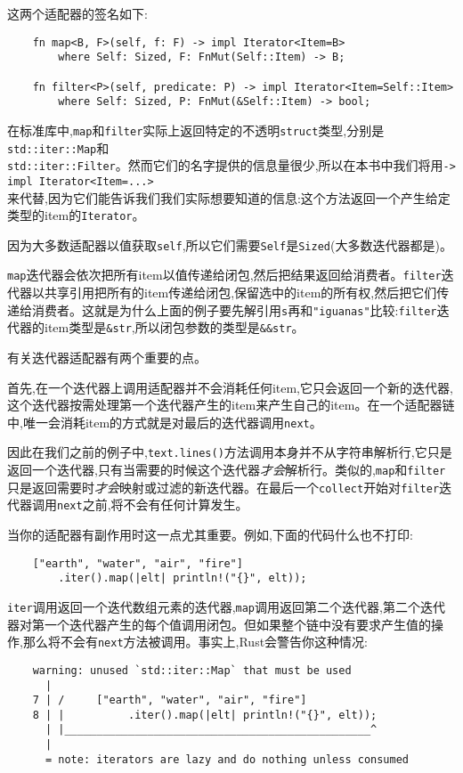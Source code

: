 这两个适配器的签名如下:
\begin{verbatim}
    fn map<B, F>(self, f: F) -> impl Iterator<Item=B>
        where Self: Sized, F: FnMut(Self::Item) -> B;

    fn filter<P>(self, predicate: P) -> impl Iterator<Item=Self::Item>
        where Self: Sized, P: FnMut(&Self::Item) -> bool;
\end{verbatim}

在标准库中,\texttt{map}和\texttt{filter}实际上返回特定的不透明\texttt{struct}类型,分别是\texttt{std::iter::Map}和\\
\texttt{std::iter::Filter}。然而它们的名字提供的信息量很少,所以在本书中我们将用\texttt{-> impl Iterator<Item=...>}\\
来代替,因为它们能告诉我们我们实际想要知道的信息:这个方法返回一个产生给定类型的item的\texttt{Iterator}。

因为大多数适配器以值获取\texttt{self},所以它们需要\texttt{Self}是\texttt{Sized}(大多数迭代器都是)。

\texttt{map}迭代器会依次把所有item以值传递给闭包,然后把结果返回给消费者。\texttt{filter}迭代器以共享引用把所有的item传递给闭包,保留选中的item的所有权,然后把它们传递给消费者。这就是为什么上面的例子要先解引用\texttt{s}再和\texttt{"iguanas"}比较:\texttt{filter}迭代器的item类型是\texttt{\&str},所以闭包参数的类型是\texttt{\&\&str}。

有关迭代器适配器有两个重要的点。

首先,在一个迭代器上调用适配器并不会消耗任何item,它只会返回一个新的迭代器,这个迭代器按需处理第一个迭代器产生的item来产生自己的item。在一个适配器链中,唯一会消耗item的方式就是对最后的迭代器调用\texttt{next}。

因此在我们之前的例子中,\texttt{text.lines()}方法调用本身并不从字符串解析行,它只是返回一个迭代器,只有当需要的时候这个迭代器\emph{才会}解析行。类似的,\texttt{map}和\texttt{filter}只是返回需要时\emph{才会}映射或过滤的新迭代器。在最后一个\texttt{collect}开始对\texttt{filter}迭代器调用\texttt{next}之前,将不会有任何计算发生。

当你的适配器有副作用时这一点尤其重要。例如,下面的代码什么也不打印:
\begin{verbatim}
    ["earth", "water", "air", "fire"]
        .iter().map(|elt| println!("{}", elt));
\end{verbatim}

\texttt{iter}调用返回一个迭代数组元素的迭代器,\texttt{map}调用返回第二个迭代器,第二个迭代器对第一个迭代器产生的每个值调用闭包。但如果整个链中没有要求产生值的操作,那么将不会有\texttt{next}方法被调用。事实上,Rust会警告你这种情况:
\begin{verbatim}
    warning: unused `std::iter::Map` that must be used
      |
    7 | /     ["earth", "water", "air", "fire"]
    8 | |          .iter().map(|elt| println!("{}", elt));
      | |________________________________________________^
      |
      = note: iterators are lazy and do nothing unless consumed
\end{verbatim}


